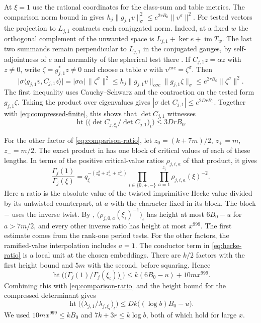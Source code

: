 \documentclass[11pt,reqno]{amsart}
\theoremstyle{definition}
\numberwithin{equation}{section}
\newcommand{\htle}[2]{\operatorname{ht}\bigl(#1\bigr)\le #2}
\begin{document}
At \(\xi=1\) use the rational coordinates for the class-sum
and table metrics. The comparison norm bound in
\cite[Proposition~14.10]{chojecki} gives
\(h_j\|g_{j,1}v\|_\sigma^2\le e^{2rB_0}\|v^\sigma\|^2\).
For tested vectors the projection to \(L_{j,1}\) contracts
each conjugated norm. Indeed, at a fixed \(w\) the orthogonal
complement of the unwanted space is
\(L_{j,1}+\ker e+\operatorname{im}T_w\).
The last two summands remain perpendicular to \(L_{j,1}\)
in the conjugated gauges, by self-adjointness of \(e\)
and normality of the spherical test there
\cite[{\rm(14.38)}]{chojecki}.
If \(C_{j,1}z=\alpha z\) with \(z\ne0\), write
\(\zeta=g_{j,1}^*z\ne0\) and choose a table \(v\) with
\(v^{c\sigma c}=\zeta^\sigma\).
Then
\[
 \big|\sigma\langle g_{j,1}v,C_{j,1}z\rangle\big|
 =|\sigma\alpha|\,\|\zeta^\sigma\|^2
 \le h_j\|g_{j,1}v\|_{c\sigma c}\|g_{j,1}\zeta\|_\sigma
 \le e^{2rB_0}\|\zeta^\sigma\|^2 .
\]
The first inequality uses Cauchy--Schwarz and the contraction
on the tested form \(g_{j,1}\zeta\).
Taking the product over eigenvalues gives
\(|\sigma\det C_{j,1}|\le e^{2DrB_0}\).
Together with \eqref{eq:compressed-finite}, this shows that
\(\det C_{j,1}\) witnesses
\[
 \htle{\bigl(\det C_{j,\xi_\iota}/\det C_{j,1}\bigr)_\iota}{3DrB_0}.
\]


For the other factor of \eqref{eq:comparison-ratio}, let
\(z_0=(k+7m)/2\), \(z_+=m\), \(z_-=m/2\).
The exact product in \cite[{\rm(14.39)--(14.41)}]{chojecki}
has one block of critical values of each of these lengths.
In terms of the positive critical-value ratios \(\rho_{j,i,a}\)
of that product, it gives
\begin{equation}\label{eq:hecke-ratio}
 \frac{\Gamma_j(1)}{\Gamma_j(\xi)}
 =q_\xi^{-(z_0^2+z_+^2+z_-^2)}
    \prod_{i\in\{0,+,-\}}\prod_{a=1}^{z_i}\rho_{j,i,a}(\xi)^{-2}.
\end{equation}
Here a ratio is the absolute value of the twisted imprimitive
Hecke value divided by its untwisted counterpart, at \(a\)
with the character fixed in its block. The block \(-\) uses
the inverse twist. By
\cite[Propositions~14.23 and~20.15]{chojecki},
\(\bigl(\rho_{j,0,a}(\xi_\iota)^{-1}\bigr)_\iota\) has height
at most \(6B_0-u\) for \(a>7m/2\), and every other inverse
ratio has height at most \(x^{999}\).
The first estimate comes from the rank-one period tests.
For the other factors, the ramified-value interpolation
includes \(a=1\). The conductor term in
\eqref{eq:hecke-ratio} is a local unit at the chosen embeddings.
There are \(k/2\) factors with the first height bound and
\(5m\) with the second, before squaring. Hence
\[
 \htle{\bigl(\Gamma_j(1)/\Gamma_j(\xi_\iota)\bigr)_\iota}
       {k(6B_0-u)+10mx^{999}}.
\]
Combining this with \eqref{eq:comparison-ratio} and
the height bound for the compressed determinant gives
\begin{equation}\label{eq:single-lower}
 \htle{\bigl(\lambda_{j,1}/\lambda_{j,\xi_\iota}\bigr)_\iota}
       {Dk\bigl((\log b)B_0-u\bigr)}.
\end{equation}
We used \(10mx^{999}\le kB_0\) and \(7k+3r\le k\log b\),
both of which hold for large \(x\).
\end{document}
